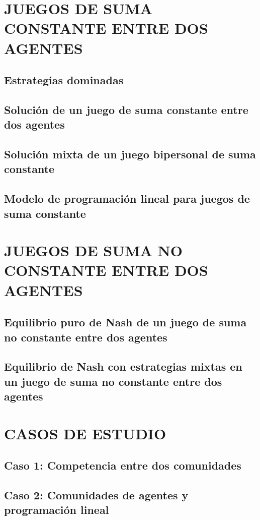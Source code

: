 \section{JUEGOS DE SUMA CONSTANTE ENTRE DOS AGENTES}\label{Sec:Juegos_SC2A}
\subsection{Estrategias dominadas}
\subsection{Solución de un juego de suma constante entre dos agentes}
\subsection{Solución mixta de un juego bipersonal de suma constante}
\subsection{Modelo de programación lineal para juegos de suma constante}

\section{JUEGOS DE SUMA NO CONSTANTE ENTRE DOS AGENTES}\label{Sec:Juegos_SNC2A}
\subsection{Equilibrio puro de Nash de un juego de suma no constante entre dos agentes}
\subsection{Equilibrio de Nash con estrategias mixtas en un juego de suma no constante entre dos agentes}

\section{CASOS DE ESTUDIO}\label{Sec:CE_DCA}
\subsection{Caso 1: Competencia entre dos comunidades}
\subsection{Caso 2: Comunidades de agentes y programación lineal}
